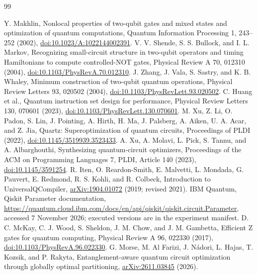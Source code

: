 \begin{thebibliography}{99}
\raggedright
{} Y. Makhlin, Nonlocal properties of two-qubit gates and
mixed states and optimization of quantum computations, Quantum Information
Processing 1, 243--252 (2002), \href{https://doi.org/10.1023/A:1022144002391}{doi:10.1023/A:1022144002391}.
 V. V. Shende, S. S. Bullock, and I. L. Markov, Recognizing
small-circuit structure in two-qubit operators and timing Hamiltonians to
compute controlled-NOT gates, Physical Review A 70, 012310 (2004),
\href{https://doi.org/10.1103/PhysRevA.70.012310}{doi:10.1103/PhysRevA.70.012310}.
 J. Zhang, J. Vala, S. Sastry, and K. B. Whaley, Minimum
construction of two-qubit quantum operations, Physical Review Letters 93,
020502 (2004), \href{https://doi.org/10.1103/PhysRevLett.93.020502}{doi:10.1103/PhysRevLett.93.020502}.
 C. Huang et al., Quantum instruction set design for
performance, Physical Review Letters 130, 070601 (2023),
\href{https://doi.org/10.1103/PhysRevLett.130.070601}{doi:10.1103/PhysRevLett.130.070601}.
 M. Xu, Z. Li, O. Padon, S. Lin, J. Pointing, A. Hirth,
H. Ma, J. Palsberg, A. Aiken, U. A. Acar, and Z. Jia, Quartz:
Superoptimization of quantum circuits, Proceedings of PLDI (2022),
\href{https://doi.org/10.1145/3519939.3523433}{doi:10.1145/3519939.3523433}.
 A. Xu, A. Molavi, L. Pick, S. Tannu, and A. Albarghouthi,
Synthesizing quantum-circuit optimizers, Proceedings of the ACM on
Programming Languages 7, PLDI, Article 140 (2023),
\href{https://doi.org/10.1145/3591254}{doi:10.1145/3591254}.
 R. Iten, O. Reardon-Smith, E. Malvetti,
L. Mondada, G. Pauvert, E. Redmond, R. S. Kohli, and R. Colbeck,
Introduction to UniversalQCompiler,
\href{https://arxiv.org/abs/1904.01072}{arXiv:1904.01072} (2019; revised 2021).
 IBM Quantum, Qiskit Parameter documentation,
\url{https://quantum.cloud.ibm.com/docs/en/api/qiskit/qiskit.circuit.Parameter},
accessed 7 November 2026; executed versions are in the experiment manifest.
 D. C. McKay, C. J. Wood, S. Sheldon, J. M. Chow, and
J. M. Gambetta, Efficient Z gates for quantum computing, Physical Review A
96, 022330 (2017), \href{https://doi.org/10.1103/PhysRevA.96.022330}{doi:10.1103/PhysRevA.96.022330}.
 G. Morse, M. Al Farizi, J. N\'adori, L. Hajas,
T. Kozsik, and P. Rakyta, Entanglement-aware quantum circuit optimization
through globally optimal partitioning,
\href{https://arxiv.org/abs/2611.03845}{arXiv:2611.03845} (2026).


\end{thebibliography}
